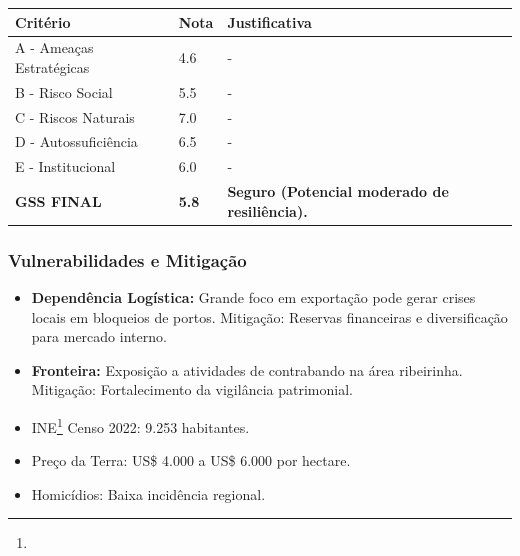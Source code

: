 \begin{table}[ht!]
\small \begin{tabular}{p{3.0cm}p{0.8cm}p{6.0cm}} \toprule
\textbf{Critério} & \textbf{Nota} & \textbf{Justificativa} \\ \midrule
A - Ameaças Estratégicas & 4.6 & - \\
B - Risco Social & 5.5 & - \\
C - Riscos Naturais & 7.0 & - \\
D - Autossuficiência & 6.5 & - \\
E - Institucional & 6.0 & - \\
\midrule \textbf{GSS FINAL} & \textbf{5.8} & \textbf{Seguro (Potencial moderado de resiliência).} \\ \bottomrule \end{tabular}
\end{table}
\subsubsection{Vulnerabilidades e
Mitigação}

\begin{itemize}
\item
  \textbf{Dependência Logística:} Grande foco em exportação pode gerar
  crises locais em bloqueios de portos. Mitigação: Reservas financeiras
  e diversificação para mercado interno.
\item
  \textbf{Fronteira:} Exposição a atividades de contrabando na área
  ribeirinha. Mitigação: Fortalecimento da vigilância patrimonial.
\item
  INE\footnote{\fineINE} Censo 2022: 9.253 habitantes.
\item
  Preço da Terra: US\$ 4.000 a US\$ 6.000 por hectare.
\item
  Homicídios: Baixa incidência regional.
\end{itemize}
